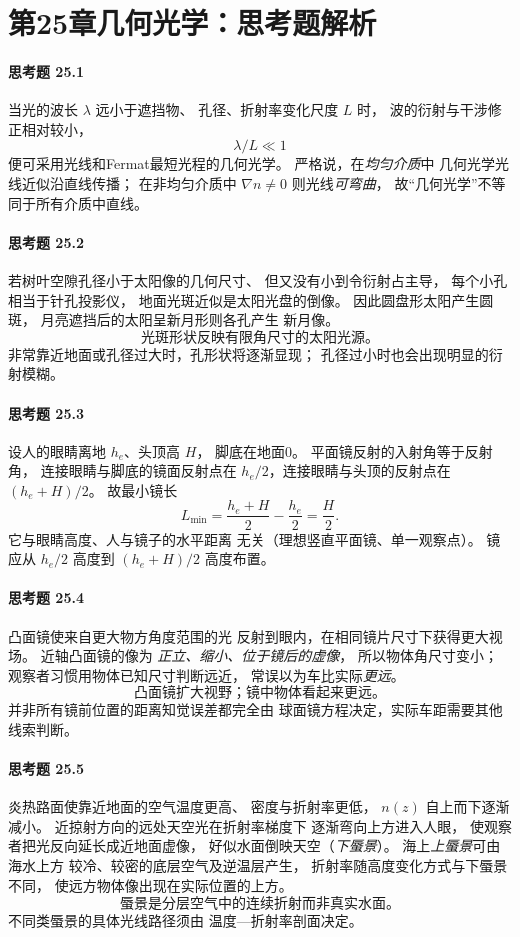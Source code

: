 \section*{第25章\quad 几何光学：思考题解析}
\paragraph{思考题 25.1}
当光的波长 \(\lambda\) 远小于遮挡物、
孔径、折射率变化尺度 \(L\) 时，
波的衍射与干涉修正相对较小，
\[
\boxed{\lambda/L\ll1}
\]
便可采用光线和Fermat最短光程的几何光学。
严格说，在\emph{均匀介质}中
几何光学光线近似沿直线传播；
在非均匀介质中
\(\nabla n\ne0\) 则光线\emph{可弯曲}，
故“几何光学”不等同于所有介质中直线。

\paragraph{思考题 25.2}
若树叶空隙孔径小于太阳像的几何尺寸、
但又没有小到令衍射占主导，
每个小孔相当于针孔投影仪，
地面光斑近似是太阳光盘的倒像。
因此圆盘形太阳产生圆斑，
月亮遮挡后的太阳呈新月形则各孔产生
新月像。
\[
\boxed{\text{光斑形状反映有限角尺寸的太阳光源。}}
\]
非常靠近地面或孔径过大时，孔形状将逐渐显现；
孔径过小时也会出现明显的衍射模糊。

\paragraph{思考题 25.3}
设人的眼睛离地 \(h_e\)、头顶高 \(H\)，
脚底在地面0。
平面镜反射的入射角等于反射角，
连接眼睛与脚底的镜面反射点在
\(h_e/2\)，连接眼睛与头顶的反射点在
\((h_e+H)/2\)。
故最小镜长
\[
\boxed{L_{\min}=\frac{h_e+H}{2}-\frac{h_e}{2}
=\frac H2}.
\]
它与眼睛高度、人与镜子的水平距离
无关（理想竖直平面镜、单一观察点）。
镜应从 \(h_e/2\) 高度到
\((h_e+H)/2\) 高度布置。

\paragraph{思考题 25.4}
凸面镜使来自更大物方角度范围的光
反射到眼内，在相同镜片尺寸下获得更大视场。
近轴凸面镜的像为
\emph{正立、缩小、位于镜后的虚像}，
所以物体角尺寸变小；
观察者习惯用物体已知尺寸判断远近，
常误以为车比实际\emph{更远}。
\[
\boxed{\text{凸面镜扩大视野；镜中物体看起来更远。}}
\]
并非所有镜前位置的距离知觉误差都完全由
球面镜方程决定，实际车距需要其他线索判断。

\paragraph{思考题 25.5}
炎热路面使靠近地面的空气温度更高、
密度与折射率更低，
\(n(z)\) 自上而下逐渐减小。
近掠射方向的远处天空光在折射率梯度下
逐渐弯向上方进入人眼，
使观察者把光反向延长成近地面虚像，
好似水面倒映天空（\emph{下蜃景}）。
海上\emph{上蜃景}可由海水上方
较冷、较密的底层空气及逆温层产生，
折射率随高度变化方式与下蜃景不同，
使远方物体像出现在实际位置的上方。
\[
\boxed{\text{蜃景是分层空气中的连续折射而非真实水面。}}
\]
不同类蜃景的具体光线路径须由
温度—折射率剖面决定。

